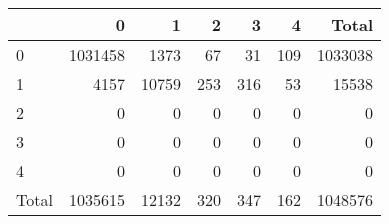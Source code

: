 \begin{tabular}{lrrrrrr}
\toprule
 & 0 & 1 & 2 & 3 & 4 & Total \\
\midrule
0 & 1031458 & 1373 & 67 & 31 & 109 & 1033038 \\
1 & 4157 & 10759 & 253 & 316 & 53 & 15538 \\
2 & 0 & 0 & 0 & 0 & 0 & 0 \\
3 & 0 & 0 & 0 & 0 & 0 & 0 \\
4 & 0 & 0 & 0 & 0 & 0 & 0 \\
Total & 1035615 & 12132 & 320 & 347 & 162 & 1048576 \\
\bottomrule
\end{tabular}
